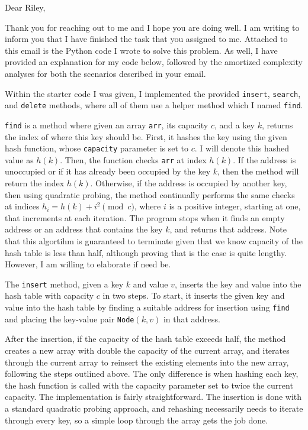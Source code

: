 \documentclass[11pt]{article}
\begin{document}
    Dear Riley,

    \medskip

    Thank you for reaching out to me and I hope you are doing well. I am writing to inform you that I have finished the task that you assigned to me. Attached to this email is the Python code I wrote to solve this problem. As well, I have provided an explanation for my code below, followed by the amortized complexity analyses for both the scenarios described in your email.

    Within the starter code I was given, I implemented the provided \texttt{insert}, \texttt{search}, and \texttt{delete} methods, where all of them use a helper method which I named \texttt{find}.

    \texttt{find} is a method where given an array \texttt{arr}, its capacity \(c\), and a key \(k\), returns the index of where this key should be. First, it hashes the key using the given hash function, whose \texttt{capacity} parameter is set to \(c\). I will denote this hashed value as \(h(k)\). Then, the function checks \texttt{arr} at index \(h(k)\). If the address is unoccupied or if it has already been occupied by the key \(k\), then the method will return the index \(h(k)\). Otherwise, if the address is occupied by another key, then using quadratic probing, the method continually performs the same checks at indices \(h_i = h(k) + i^2 \pmod c\), where \(i\) is a positive integer, starting at one, that increments at each iteration. The program stops when it finds an empty address or an address that contains the key \(k\), and returns that address. Note that this algortihm is guaranteed to terminate given that we know capacity of the hash table is less than half, although proving that is the case is quite lengthy. However, I am willing to elaborate if need be.

    The \texttt{insert} method, given a key \(k\) and value \(v\), inserts the key and value into the hash table with capacity \(c\) in two steps. To start, it inserts the given key and value into the hash table by finding a suitable address for insertion using \texttt{find} and placing the key-value pair \texttt{Node}\((k,v)\) in that address.

    After the insertion, if the capacity of the hash table exceeds half, the method creates a new array with double the capacity of the current array, and iterates through the current array to reinsert the existing elements into the new array, following the steps outlined above. The only difference is when hashing each key, the hash function is called with the capacity parameter set to twice the current capacity. The implementation is fairly straightforward. The insertion is done with a standard quadratic probing approach, and rehashing necessarily needs to iterate through every key, so a simple loop through the array gets the job done.
\end{document}
